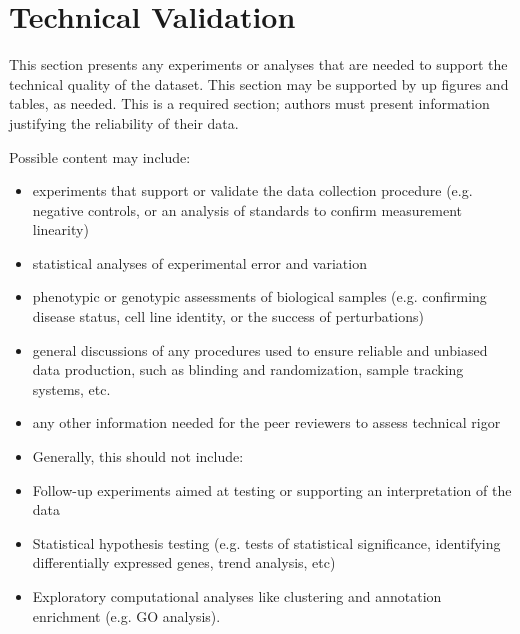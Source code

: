 \section{Technical Validation}

This section presents any experiments or analyses that are needed to support the technical quality of the dataset.  This section may be supported by up figures and tables, as needed. This is a required section; authors must present information justifying the reliability of their data. 

Possible content may include:
\begin{itemize}
\item experiments that support or validate the data collection procedure (e.g. negative controls, or an analysis of standards to confirm measurement linearity)
\item statistical analyses of experimental error and variation
\item phenotypic or genotypic assessments of biological samples (e.g. confirming disease status, cell line identity, or the success of perturbations)
\item general discussions of any procedures used to ensure reliable and unbiased data production, such as blinding and randomization, sample tracking systems, etc. 
\item any other information needed for the peer reviewers to assess technical rigor
\item Generally, this should not include:
\item Follow-up experiments aimed at testing or supporting an interpretation of the data
\item Statistical hypothesis testing (e.g. tests of statistical significance, identifying differentially expressed genes, trend analysis, etc)
\item Exploratory computational analyses like clustering and annotation enrichment (e.g. GO analysis). 
\end{itemize}
